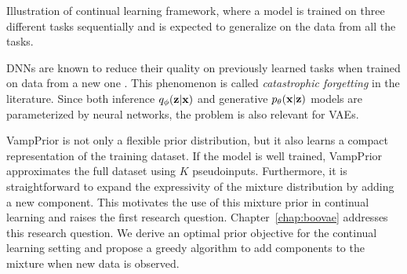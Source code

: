 \begin{marginfigure}
\caption{Illustration of continual learning framework, where a model is trained on three different tasks sequentially and is expected to generalize on the data from all the tasks.}\label{fig:intro_cl_plot}
\end{marginfigure}
DNNs are known to reduce their quality on previously learned tasks when trained on data from a new one \citep{kirkpatrick2017overcoming}. 
This phenomenon is called \textit{catastrophic forgetting} \citep{mccloskey1989catastrophic} in the literature. 
Since both inference ${q_{\phi}({\mathbf{z}}|{\mathbf{x}})}$ and generative ${p_{\theta}({\mathbf{x}}|{\mathbf{z}})}$ models are parameterized by neural networks, the problem is also relevant for VAEs.  

VampPrior is not only a flexible prior distribution, but it also learns a compact representation of the training dataset. 
If the model is well trained, VampPrior approximates the full dataset using $K$ pseudoinputs. 
Furthermore, it is straightforward to expand the expressivity of the mixture distribution by adding a new component.
This motivates the use of this mixture prior in continual learning and raises the first research question.
Chapter~\ref{chap:boovae} addresses this research question.
We derive an optimal prior objective for the continual learning setting and propose a greedy algorithm to add components to the mixture when new data is observed. 


